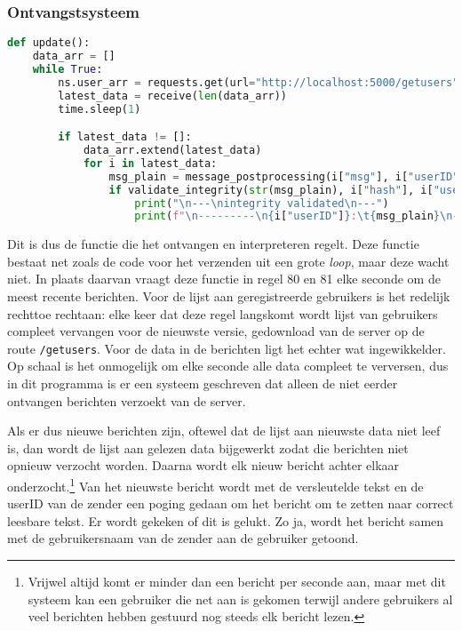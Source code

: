 \documentclass{report} %
\let\code\lstinline
\begin{document}
\subsubsection{Ontvangstsysteem}
\begin{lstlisting}[language=Python, firstnumber=77]
def update():
    data_arr = []
    while True:
        ns.user_arr = requests.get(url="http://localhost:5000/getusers").json()
        latest_data = receive(len(data_arr))
        time.sleep(1)

        if latest_data != []:
            data_arr.extend(latest_data)
            for i in latest_data:
                msg_plain = message_postprocessing(i["msg"], i["userID"])
                if validate_integrity(str(msg_plain), i["hash"], i["userID"]):
                    print("\n---\nintegrity validated\n---")
                    print(f"\n---------\n{i["userID"]}:\t{msg_plain}\n---------\ncryptsystem01 ~$ ", end="")
\end{lstlisting}\label{stuur_code}
Dit is dus de functie die het ontvangen en interpreteren regelt. Deze functie bestaat net zoals de code voor het verzenden uit een grote \textit{loop}, maar deze wacht niet. In plaats daarvan vraagt deze functie in regel 80 en 81 elke seconde om de meest recente berichten. Voor de lijst aan geregistreerde  gebruikers is het redelijk rechttoe rechtaan: elke keer dat deze regel langskomt wordt lijst van gebruikers compleet vervangen voor de nieuwste versie, gedownload van de server op de route \code{/getusers}. Voor de data in de berichten ligt het echter wat ingewikkelder. Op schaal is het onmogelijk om elke seconde alle data compleet te verversen, dus in dit programma is er een systeem geschreven dat alleen de niet eerder ontvangen berichten verzoekt van de server.
\par Als er dus nieuwe berichten zijn, oftewel dat de lijst aan nieuwste data niet leef is, dan wordt de lijst aan gelezen data bijgewerkt zodat die berichten niet opnieuw verzocht worden. Daarna wordt elk nieuw bericht achter elkaar onderzocht.\footnote{Vrijwel altijd komt er minder dan een bericht per seconde aan, maar met dit systeem kan een gebruiker die net aan is gekomen terwijl andere gebruikers al veel berichten hebben gestuurd nog steeds elk bericht lezen.} Van het nieuwste bericht wordt met de versleutelde tekst en de userID van de zender een poging gedaan om het bericht om te zetten naar correct leesbare tekst. Er wordt gekeken of dit is gelukt. Zo ja, wordt het bericht samen met de gebruikersnaam van de zender aan de gebruiker getoond. \\
\end{document}
